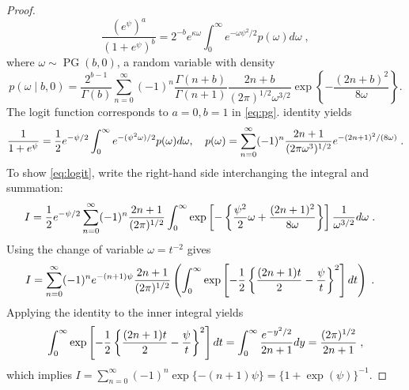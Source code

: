 \documentclass[lineno]{biometrika}
\begin{document}
\begin{proof}
\begin{equation}
  \frac{(e^{\psi})^a}{(1+e^{\psi})^b} = 2^{-b} e^{\kappa \omega} 
  \int_0^{\infty} e^{-\omega \psi^2/2} p(\omega) d\omega
  \;, 
  \label{eq:pg}
\end{equation}
where $\omega \sim \operatorname{PG}(b,0)$, a \PG{} random variable with density
$$
p(\omega \mid b, 0) = \frac{2^{b-1}}{\Gamma(b)} 
\sum_{n=0}^{\infty} (-1)^n \frac{\Gamma(n+b)}{\Gamma(n+1)} 
\frac{2n + b}{(2 \pi)^{1/2} \omega^{3/2}} 
\exp\left\{-\frac{(2 n + b)^2}{8 \omega} \right\}.
$$
The logit function corresponds to $a=0,b=1$ in \eqref{eq:pg}. \CS{} identity yields
\begin{equation}
  \frac{1}{1+e^{\psi}} = \half e^{- \psi/2} \int_0^{\infty} e^{-(\psi^2\omega)/2} p(\omega) d\omega,
  \quad p(\omega) = \sum_{n=0}^{\infty} (-1)^n \frac{2n+1}{ (2 \pi \omega^3)^{1/2}} 
  e^{-(2n+1)^2/(8 \omega)}
  \label{eq:logit}
  \;.
\end{equation}
To show \eqref{eq:logit}, write the right-hand side interchanging the integral and summation:
\begin{align*}
  I & = \frac{1}{2} e^{-\psi/2} \sum_{n=0}^{\infty} (-1)^n \frac{2n+1}{(2 \pi)^{1/2}} 
  \int_0^{\infty} 
  \exp\left[-\left\{ \frac{\psi^2}{2} \omega + \frac{(2n+1)^2}{8 \omega} \right\} \right] \frac{1}{\omega^{3/2}} d\omega
  \;. 
\end{align*}
Using the change of variable $\omega = t^{-2}$ gives
\begin{align*}
  I & = \sum_{n=0}^{\infty} (-1)^n e^{-(n+1)\psi} 
  \frac{2n + 1}{(2 \pi)^{1/2}} 
  \left( \int_{0}^{\infty} 
    \exp\left[-\frac{1}{2} \left\{ \frac{(2n+1)t}{2} - \frac{\psi}{t}\right\}^2 \right] dt 
  \right)
  \;.
\end{align*}
Applying the \CS{} identity to the inner integral yields 
\[
\int_{0}^{\infty} 
\exp\left[-\frac{1}{2} \left\{ \frac{(2n+1)t}{2} - \frac{\psi}{t}\right \}^2 \right] dt 
= \int_0^{\infty} \frac{e^{-y^2/2}}{2n+1} dy= \frac{(2\pi)^{1/2}}{2n+1}
\;,
\]
which implies $I = \sum_{n=0}^{\infty} (-1)^n \exp\{-(n+1) \psi\} = \{1+\exp(\psi)\}^{-1}$. 
\end{proof}
\end{document}
